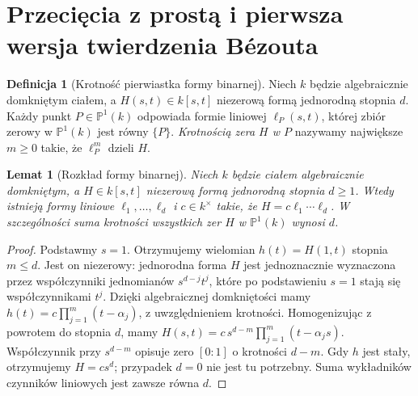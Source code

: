\documentclass[11pt,a4paper,openany]{report}
\numberwithin{equation}{section}
\theoremstyle{plain}
\newtheorem{lemat}[twierdzenie]{Lemat}
\theoremstyle{definition}
\newtheorem{definicja}[twierdzenie]{Definicja}
\theoremstyle{remark}
\newcommand{\PP}{\mathbb P}
\begin{document}
\section{Przecięcia z prostą i pierwsza wersja twierdzenia Bézouta}

\begin{definicja}[Krotność pierwiastka formy binarnej]
Niech $k$ będzie algebraicznie domkniętym ciałem,
a $H(s,t)\in k[s,t]$ niezerową formą jednorodną stopnia $d$.
Każdy punkt $P\in\PP^1(k)$ odpowiada formie liniowej
$\ell_P(s,t)$, której zbiór zerowy w $\PP^1(k)$ jest
równy $\{P\}$. \emph{Krotnością zera $H$ w $P$} nazywamy
największe $m\ge0$ takie, że $\ell_P^m$ dzieli $H$.
\end{definicja}

\begin{lemat}[Rozkład formy binarnej]
Niech $k$ będzie ciałem algebraicznie domkniętym,
a $H\in k[s,t]$ niezerową formą jednorodną stopnia $d\ge1$.
Wtedy istnieją formy liniowe $\ell_1,\ldots,\ell_d$
i $c\in k^\times$ takie, że $H=c\ell_1\cdots\ell_d$.
W szczególności suma krotności wszystkich zer $H$ w $\PP^1(k)$
wynosi $d$.
\end{lemat}
\begin{proof}
Podstawmy $s=1$. Otrzymujemy wielomian
$h(t)=H(1,t)$ stopnia $m\le d$. Jest on niezerowy:
jednorodna forma $H$ jest jednoznacznie wyznaczona przez
współczynniki jednomianów $s^{d-j}t^j$, które po
podstawieniu $s=1$ stają się współczynnikami $t^j$.
Dzięki algebraicznej domkniętości mamy
$h(t)=c\prod_{j=1}^m(t-\alpha_j)$, z uwzględnieniem krotności.
Homogenizując z powrotem do stopnia $d$, mamy
$H(s,t)=c\,s^{d-m}\prod_{j=1}^m(t-\alpha_js)$.
Współczynnik przy $s^{d-m}$ opisuje zero $[0:1]$
o krotności $d-m$. Gdy $h$ jest stały, otrzymujemy
$H=cs^d$; przypadek $d=0$ nie jest tu potrzebny.
Suma wykładników czynników liniowych jest zawsze równa $d$.
\end{proof}
\end{document}

